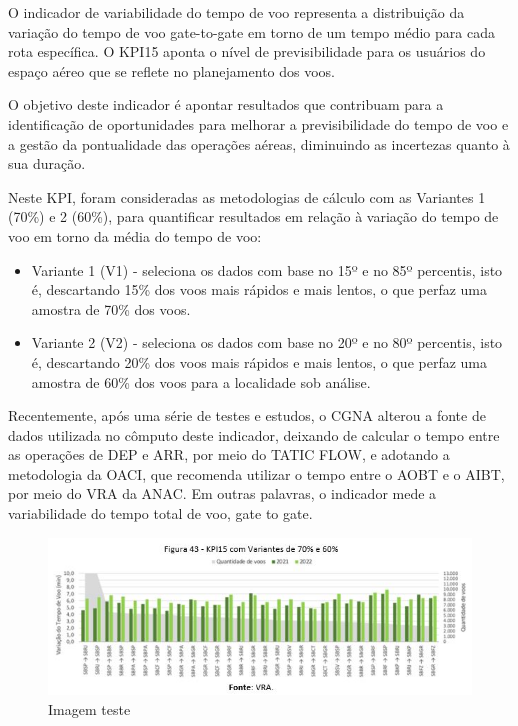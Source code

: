 \documentclass[
]{book}
\providecommand{\tightlist}{%
  \setlength{\itemsep}{0pt}\setlength{\parskip}{0pt}}
\begin{document}
O indicador de variabilidade do tempo de voo representa a distribuição da variação do tempo de voo gate-to-gate em torno de um tempo médio para cada rota específica. O KPI15 aponta o nível de previsibilidade para os usuários do espaço aéreo que se reflete no planejamento dos voos.

O objetivo deste indicador é apontar resultados que contribuam para a identificação de oportunidades para melhorar a previsibilidade do tempo de voo e a gestão da pontualidade das operações aéreas, diminuindo as incertezas quanto à sua duração.

Neste KPI, foram consideradas as metodologias de cálculo com as Variantes 1 (70\%) e 2 (60\%), para quantificar resultados em relação à variação do tempo de voo em torno da média do tempo de voo:

\begin{itemize}
\tightlist
\item
  Variante 1 (V1) - seleciona os dados com base no 15º e no 85º percentis, isto é, descartando 15\% dos voos mais rápidos e mais lentos, o que perfaz uma amostra de 70\% dos voos.
\item
  Variante 2 (V2) - seleciona os dados com base no 20º e no 80º percentis, isto é, descartando 20\% dos voos mais rápidos e mais lentos, o que perfaz uma amostra de 60\% dos voos para a localidade sob análise.
\end{itemize}

Recentemente, após uma série de testes e estudos, o CGNA alterou a fonte de dados utilizada no cômputo deste indicador, deixando de calcular o tempo entre as operações de DEP e ARR, por meio do TATIC FLOW, e adotando a metodologia da OACI, que recomenda utilizar o tempo entre o AOBT e o AIBT, por meio do VRA da ANAC. Em outras palavras, o indicador mede a variabilidade do tempo total de voo, gate to gate.

\begin{figure}
\centering
\includegraphics{imagens/fig44.jpg}
\caption{Imagem teste}
\end{figure}
\end{document}
